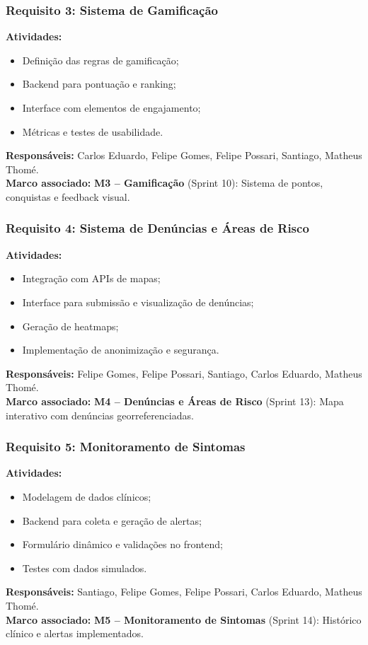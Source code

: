\documentclass[a4paper, 12pt]{article}
\begin{document}
\subsubsection*{Requisito 3: Sistema de Gamificação}
\textbf{Atividades:}
\begin{itemize}
  \item Definição das regras de gamificação;
  \item Backend para pontuação e ranking;
  \item Interface com elementos de engajamento;
  \item Métricas e testes de usabilidade.
\end{itemize}
\textbf{Responsáveis:} Carlos Eduardo, Felipe Gomes, Felipe Possari, Santiago, Matheus Thomé. \\
\textbf{Marco associado:} \textbf{M3 – Gamificação} (Sprint 10): Sistema de pontos, conquistas e feedback visual.

\subsubsection*{Requisito 4: Sistema de Denúncias e Áreas de Risco}
\textbf{Atividades:}
\begin{itemize}
  \item Integração com APIs de mapas;
  \item Interface para submissão e visualização de denúncias;
  \item Geração de heatmaps;
  \item Implementação de anonimização e segurança.
\end{itemize}
\textbf{Responsáveis:} Felipe Gomes, Felipe Possari, Santiago, Carlos Eduardo, Matheus Thomé. \\
\textbf{Marco associado:} \textbf{M4 – Denúncias e Áreas de Risco} (Sprint 13): Mapa interativo com denúncias georreferenciadas.

\subsubsection*{Requisito 5: Monitoramento de Sintomas}
\textbf{Atividades:}
\begin{itemize}
  \item Modelagem de dados clínicos;
  \item Backend para coleta e geração de alertas;
  \item Formulário dinâmico e validações no frontend;
  \item Testes com dados simulados.
\end{itemize}
\textbf{Responsáveis:} Santiago, Felipe Gomes, Felipe Possari, Carlos Eduardo, Matheus Thomé. \\
\textbf{Marco associado:} \textbf{M5 – Monitoramento de Sintomas} (Sprint 14): Histórico clínico e alertas implementados.
\end{document}
